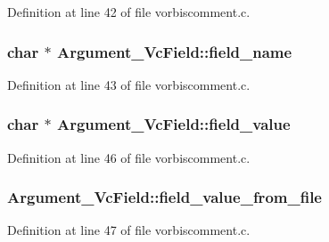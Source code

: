 Definition at line 42 of file vorbiscomment.\+c.

\subsubsection[{\texorpdfstring{field\+\_\+name}{field_name}}]{\setlength{\rightskip}{0pt plus 5cm}char $\ast$ Argument\+\_\+\+Vc\+Field\+::field\+\_\+name}\hypertarget{struct_argument___vc_field_a7675074874926164d81fde4b17932172}{}\label{struct_argument___vc_field_a7675074874926164d81fde4b17932172}


Definition at line 43 of file vorbiscomment.\+c.

\subsubsection[{\texorpdfstring{field\+\_\+value}{field_value}}]{\setlength{\rightskip}{0pt plus 5cm}char $\ast$ Argument\+\_\+\+Vc\+Field\+::field\+\_\+value}\hypertarget{struct_argument___vc_field_ace3aa786762da18fc086b6a877273d23}{}\label{struct_argument___vc_field_ace3aa786762da18fc086b6a877273d23}


Definition at line 46 of file vorbiscomment.\+c.

\subsubsection[{\texorpdfstring{field\+\_\+value\+\_\+from\+\_\+file}{field_value_from_file}}]{ Argument\+\_\+\+Vc\+Field\+::field\+\_\+value\+\_\+from\+\_\+file}\hypertarget{struct_argument___vc_field_a7dc1db175ddf4ebd8ef6560b00285842}{}\label{struct_argument___vc_field_a7dc1db175ddf4ebd8ef6560b00285842}


Definition at line 47 of file vorbiscomment.\+c.

